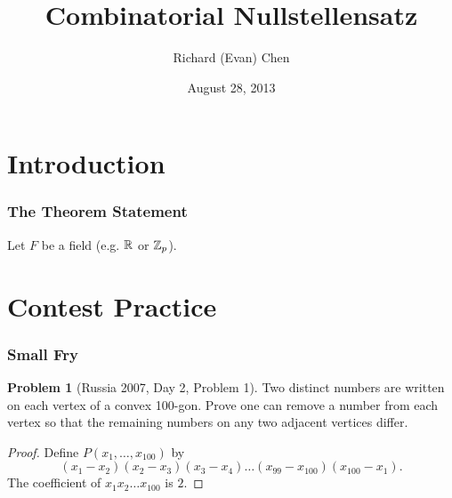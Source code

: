 \documentclass{beamer}
\theoremstyle{definition}
\newtheorem{problem*}{Problem}
\begin{document}
\title{Combinatorial Nullstellensatz}
\author{Richard (Evan) Chen}
\date{August 28, 2013}
\maketitle

\section{Introduction}
\begin{frame}
  \frametitle{The Theorem Statement}
  Let $F$ be a field (e.g. $\mathbb R$ or $\mathbb Z_p$).
\end{frame}

\section{Contest Practice}
\begin{frame}
  \frametitle{Small Fry}
  \begin{problem*}[Russia 2007, Day 2, Problem 1]
    Two distinct numbers are written on each vertex of a convex 100-gon. Prove one can remove a number from each vertex so that the remaining numbers on any two adjacent vertices differ.
  \end{problem*}
  \pause
  \begin{proof}
    Define $P\left(x_1,\dots,x_{100}\right)$ by \[ \left( x_1-x_2 \right)\left( x_2-x_3 \right)\left( x_3-x_4 \right)\dots\left( x_{99}-x_{100} \right)\left( x_{100}-x_1 \right). \]
    The coefficient of $x_1x_2\dots x_{100}$ is $2$.
  \end{proof}
\end{frame}
\end{document}
